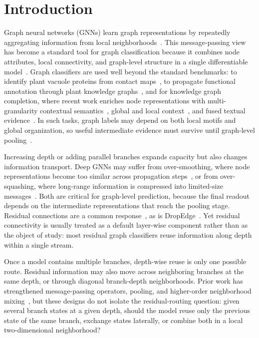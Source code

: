 \section{Introduction}
\label{sec:intro}

Graph neural networks (GNNs) learn graph representations by repeatedly
aggregating information from local neighborhoods~\cite{kipf2017gcn}.
This message-passing view has become a standard tool for graph classification
because it combines node attributes, local connectivity, and graph-level
structure in a single differentiable model~\cite{gilmer2017neural,wu2020comprehensive}.
Graph classifiers are used well beyond the standard benchmarks: to identify
plant vacuole proteins from contact
maps~\cite{suiIdentificationPlantVacuole2023}, to propagate functional
annotation through plant knowledge
graphs~\cite{baongoImprovingPlantFunctional2025}, and for knowledge graph
completion, where recent work enriches node representations with
multi-granularity contextual semantics~\cite{wang2025multigranularity}, global
and local context~\cite{wang2024conee}, and fused textual
evidence~\cite{wang2024textenhanced}.
In such tasks, graph labels may depend on both local motifs and global
organization, so useful intermediate evidence must survive until graph-level
pooling~\cite{ying2018hierarchical}.

Increasing depth or adding parallel branches expands capacity but also changes
information transport. Deep GNNs may suffer from over-smoothing, where node
representations become too similar across propagation
steps~\cite{li2018deeper}, or from over-squashing, where
long-range information is compressed into limited-size
messages~\cite{alon2020bottleneck,topping2021understanding}. Both are critical
for graph-level prediction, because the final readout depends on the
intermediate representations that reach the pooling stage. Residual
connections are a common response~\cite{he2016deep,bresson2017residual}, as is
DropEdge~\cite{rong2019dropedge}. Yet residual
connectivity is usually treated as a default layer-wise component rather than
as the object of study: most residual graph classifiers reuse information along
depth within a single stream.

Once a model contains multiple branches, depth-wise reuse is only one possible
route. Residual information may also move across neighboring branches at the
same depth, or through diagonal branch-depth neighborhoods. Prior work has
strengthened message-passing operators, pooling, and higher-order neighborhood
mixing~\cite{abu2019mixhop,li2024graph}, but
these designs do not isolate the residual-routing question: given several branch
states at a given depth, should the model reuse only the previous state of the
same branch, exchange states laterally, or combine both in a local
two-dimensional neighborhood?

